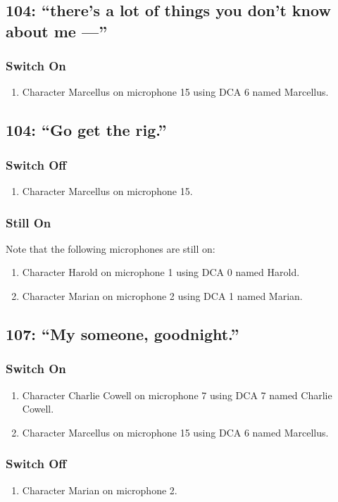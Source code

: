 \subsection* {104: ``there's a lot of things you don't know about me ---''}
\subsubsection* {Switch On}
\begin{enumerate}
\item Character Marcellus on microphone 15 using DCA 6 named Marcellus.
\end{enumerate}
\subsection* {104: ``Go get the rig.''}
\subsubsection* {Switch Off}
\begin{enumerate}
\item Character Marcellus on microphone 15.
\end{enumerate}
\subsubsection* {Still On}
Note that the following microphones are still on:
\begin{enumerate}
\item Character Harold on microphone 1 using DCA 0 named Harold.
\item Character Marian on microphone 2 using DCA 1 named Marian.
\end{enumerate}
\subsection* {107: ``My someone, goodnight.''}
\subsubsection* {Switch On}
\begin{enumerate}
\item Character Charlie Cowell on microphone 7 using DCA 7 named Charlie Cowell.
\item Character Marcellus on microphone 15 using DCA 6 named Marcellus.
\end{enumerate}
\subsubsection* {Switch Off}
\begin{enumerate}
\item Character Marian on microphone 2.
\end{enumerate}
